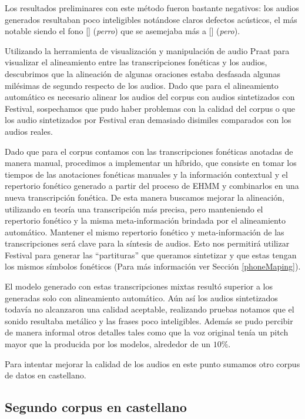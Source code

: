 Los resultados preliminares con este método fueron bastante negativos: los audios generados resultaban poco inteligibles notándose claros defectos acústicos, el más notable siendo el fono [] (\textit{perro}) que se asemejaba más a [] (\textit{pero}).

Utilizando la herramienta de visualización y manipulación de audio Praat \cite{praat} para visualizar el alineamiento entre las transcripciones fonéticas y los audios, descubrimos que la alineación de algunas oraciones estaba desfasada algunas milésimas de segundo respecto de los audios. Dado que para el alineamiento automático es necesario alinear los audios del corpus con audios sintetizados con Festival, sospechamos que pudo haber problemas con la calidad del corpus o que los audio sintetizados por Festival eran demasiado disimiles comparados con los audios reales. 

Dado que para el corpus contamos con las transcripciones fonéticas anotadas de manera manual, procedimos a implementar un híbrido, que consiste en tomar los tiempos de las anotaciones fonéticas manuales y la información contextual y el repertorio fonético generado a partir del proceso de EHMM y combinarlos en una nueva transcripción fonética. De esta manera buscamos mejorar la alineación, utilizando en teoría una transcripción más precisa, pero manteniendo el repertorio fonético y la misma meta-información brindada por el alineamiento automático. Mantener el mismo repertorio fonético y meta-información de las transcripciones será clave para la síntesis de audios. Esto nos permitirá utilizar Festival para generar las ``partituras'' que queramos sintetizar y que estas tengan los mismos símbolos fonéticos (Para más información ver Sección \ref{phoneMaping}).

El modelo generado con estas transcripciones mixtas resultó superior a los generadas solo con alineamiento automático. Aún así los audios sintetizados todavía no alcanzaron una calidad aceptable, realizando pruebas notamos que el sonido resultaba metálico y las frases poco inteligibles. Además se pudo percibir de manera informal otros detalles tales como que la voz original tenía un pitch mayor que la producida por los modelos, alrededor de un $10\%$.

Para intentar mejorar la calidad de los audios en este punto sumamos otro corpus de datos en castellano.

\subsection{Segundo corpus en castellano}

